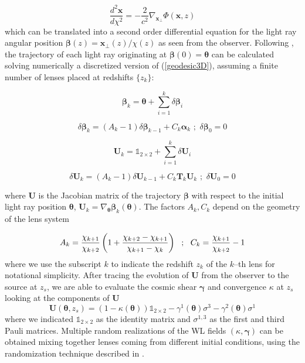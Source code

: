 \documentclass[5p]{elsarticle}
\newcommand{\bb}[1]{\mathbf{#1}}
\begin{document}
\begin{equation}
\label{geodesic3D}
\frac{d^2\bb{x}}{d\chi^2} = -\frac{2}{c^2}\nabla_\bb{x_\perp}\Phi(\bb{x},z)
\end{equation}
%
which can be translated into a second order differential equation for the light ray angular position $\pmb{\beta}(z)=\bb{x}_\perp(z)/\chi(z)$ as seen from the observer. Following \citep{RayTracingHartlap}, the trajectory of each light ray originating at $\pmb{\beta}(0)=\pmb{\theta}$ can be calculated solving numerically a discretized version of (\ref{geodesic3D}), assuming a finite number of lenses placed at redshifts $\{z_k\}$:
%

\begin{equation}
\label{geodesic2D}
\pmb{\beta}_{k} = \pmb{\theta} + \sum_{i=1}^k\delta\pmb{\beta}_i 
\end{equation}

\begin{equation}
\label{deflections}
\delta\pmb{\beta}_k = (A_k-1)\delta\pmb{\beta}_{k-1} + C_k\pmb{\alpha}_k \,\, ; \,\, \delta\pmb{\beta}_0=0
\end{equation}

\begin{equation}
\label{jacobian}
\bb{U}_{k} = \mathds{1}_{2\times2} + \sum_{i=1}^k\delta\bb{U}_i 
\end{equation}

\begin{equation}
\label{sheartensorproduct}
\delta\bb{U}_k = (A_k-1)\delta\bb{U}_{k-1} + C_k\bb{T}_k\bb{U}_k \,\, ; \,\, \delta\bb{U}_0=0
\end{equation}

%
where $\bb{U}$ is the Jacobian matrix of the trajectory $\pmb{\beta}$ with respect to the initial light ray position $\pmb{\theta}$, $\bb{U}_k=\nabla_{\pmb{\theta}}\pmb{\beta}_k(\pmb{\theta})$. The factors $A_k,C_k$ depend on the geometry of the lens system

\begin{equation}
A_k = \frac{\chi_{k+1}}{\chi_{k+2}}\left(1 + \frac{\chi_{k+2}-\chi_{k+1}}{\chi_{k+1}-\chi_k}\right) \,\,\,\, ; \,\,\,\, C_k = \frac{\chi_{k+1}}{\chi_{k+2}} - 1 \\ \\
\end{equation} 
%
where we use the subscript $k$ to indicate the redshift $z_k$ of the $k$--th lens for notational simplicity. After tracing the evolution of $\bb{U}$ from the observer to the source at $z_s$, we are able to evaluate the cosmic shear $\pmb{\gamma}$ and convergence $\kappa$ at $z_s$ looking at the components of $\bb{U}$
\begin{equation}
\bb{U}(\pmb{\theta},z_s) = (1-\kappa(\pmb{\theta}))\mathds{1}_{2\times2} - \gamma^1(\pmb{\theta})\sigma^3 - \gamma^2(\pmb{\theta})\sigma^1
\end{equation}
%
where we indicated $\mathds{1}_{2\times2}$ as the identity matrix and $\sigma^{1,3}$ as the first and third Pauli matrices. Multiple random realizations of the WL fields $(\kappa,\pmb{\gamma})$ can be obtained mixing together lenses coming from different initial conditions, using the randomization technique described in \citep{Petri16}.
\end{document}
